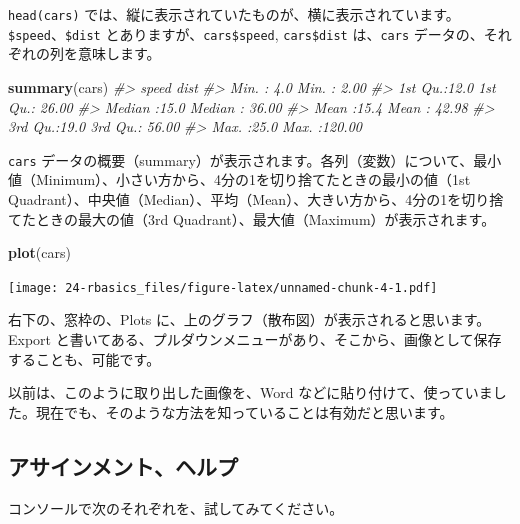 \documentclass[
  xelatex, ja=standard]{bxjsbook}
\newenvironment{Shaded}{\begin{snugshade}}{\end{snugshade}}
\newcommand{\CommentTok}[1]{\textcolor[rgb]{0.56,0.35,0.01}{\textit{#1}}}
\newcommand{\FunctionTok}[1]{\textcolor[rgb]{0.13,0.29,0.53}{\textbf{#1}}}
\newcommand{\NormalTok}[1]{#1}
\theoremstyle{definition}
\theoremstyle{definition}
\theoremstyle{definition}
\theoremstyle{definition}
\theoremstyle{remark}
\begin{document}
\texttt{head(cars)} では、縦に表示されていたものが、横に表示されています。\texttt{\$speed}、\texttt{\$dist} とありますが、\texttt{cars\$speed}, \texttt{cars\$dist} は、\texttt{cars} データの、それぞれの列を意味します。

\begin{Shaded}
\begin{Highlighting}[]
\FunctionTok{summary}\NormalTok{(cars)}
\CommentTok{\#\textgreater{}      speed           dist       }
\CommentTok{\#\textgreater{}  Min.   : 4.0   Min.   :  2.00  }
\CommentTok{\#\textgreater{}  1st Qu.:12.0   1st Qu.: 26.00  }
\CommentTok{\#\textgreater{}  Median :15.0   Median : 36.00  }
\CommentTok{\#\textgreater{}  Mean   :15.4   Mean   : 42.98  }
\CommentTok{\#\textgreater{}  3rd Qu.:19.0   3rd Qu.: 56.00  }
\CommentTok{\#\textgreater{}  Max.   :25.0   Max.   :120.00}
\end{Highlighting}
\end{Shaded}

\texttt{cars} データの概要（summary）が表示されます。各列（変数）について、最小値（Minimum）、小さい方から、4分の1を切り捨てたときの最小の値（1st Quadrant）、中央値（Median）、平均（Mean）、大きい方から、4分の1を切り捨てたときの最大の値（3rd Quadrant）、最大値（Maximum）が表示されます。

\begin{Shaded}
\begin{Highlighting}[]
\FunctionTok{plot}\NormalTok{(cars)}
\end{Highlighting}
\end{Shaded}

\texttt{[image: 24-rbasics\_files/figure-latex/unnamed-chunk-4-1.pdf]}

右下の、窓枠の、Plots に、上のグラフ（散布図）が表示されると思います。Export と書いてある、プルダウンメニューがあり、そこから、画像として保存することも、可能です。

以前は、このように取り出した画像を、Word などに貼り付けて、使っていました。現在でも、そのような方法を知っていることは有効だと思います。

\hypertarget{ux30a2ux30b5ux30a4ux30f3ux30e1ux30f3ux30c8ux30d8ux30ebux30d7}{%
\subsection{アサインメント、ヘルプ}\label{ux30a2ux30b5ux30a4ux30f3ux30e1ux30f3ux30c8ux30d8ux30ebux30d7}}

コンソールで次のそれぞれを、試してみてください。
\end{document}
